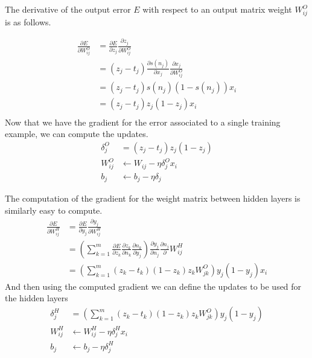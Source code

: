 \documentclass[conference]{IEEEtran}
\begin{document}
The derivative of the output error $E$ with respect to an output matrix weight $W_{ij}^O$ is as follows.

\begin{equation}
\begin{split}
\frac{\partial E}{\partial W^O_{ij}} &= \frac{\partial E}{\partial z_j}\frac{\partial z_j}{\partial W^O_{ij}} \\
																	 &=(z_j - t_j)\frac{\partial s(n_j)}{\partial x_j}\frac{\partial x_j}{\partial W^O_{ij}} \\
																	 &=(z_j-t_j)s(n_j)(1-s(n_j))x_i \\
																	 &=(z_j-t_j)z_j(1-z_j)x_i \\
\end{split}
\label{}
\end{equation}
Now that we have the gradient for the error associated to a single training example, we can compute the updates.
\begin{equation}
\begin{split}
\delta^O_j &= (z_j-t_j)z_j(1-z_j) \\
W^O_{ij} &\leftarrow W_{ij} - \eta \delta^O_j x_i \\
b_j &\leftarrow b_j - \eta\delta_j
\end{split}
\end{equation}

The computation of the gradient for the weight matrix between hidden layers is similarly easy to compute.
\begin{equation}
\begin{split}
\frac{\partial E}{\partial W^H_{ij}} &= \frac{\partial E}{\partial y_j}\frac{\partial y_j}{\partial W^H_{ij}} \\
																	 &=\left(\sum_{k=1}^m \frac{\partial E}{\partial z_k}\frac{\partial z_k}{\partial n_k}\frac{\partial n_k}{\partial y_j} \right)\frac{\partial y_j}{\partial n_j}\frac{\partial n_j}\partial W_{ij}^H\\
																	 &=\left(\sum_{k=1}^m (z_k - t_k)(1-z_k)z_kW_{jk}^O \right)y_j(1-y_j)x_i
\end{split}
\label{}
\end{equation}
And then using the computed gradient we can define the updates to be used for the hidden layers
\begin{equation}
\begin{split}
\delta^H_j &= \left(\sum_{k=1}^m (z_k - t_k)(1-z_k)z_kW_{jk}^O \right)y_j(1-y_j) \\
W^H_{ij} &\leftarrow W^H_{ij} - \eta\delta^H_jx_i \\
b_j &\leftarrow b_j - \eta\delta^H_j
\end{split}
\end{equation}
\end{document}
